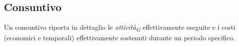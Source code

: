 \subsection{Consuntivo}
Un consuntivo riporta in dettaglio le \textit{attività}\textsubscript{\textit{G}} effettivamente eseguite e i costi (economici e temporali) effettivamente sostenuti durante un periodo specifico.
